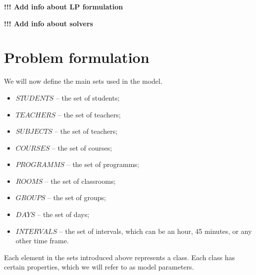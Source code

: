 \documentclass{article}
\begin{document}
\textbf{!!! Add info about LP formulation}

\textbf{!!! Add info about solvers}

\section{Problem formulation}

We will now define the main sets used in the model.

\begin{itemize}
  \setlength\itemsep{0.05em}
    \item $STUDENTS$ -- the set of students;
    \item $TEACHERS$ -- the set of teachers;
    \item $SUBJECTS$ -- the set of teachers;
    \item $COURSES$ -- the set of courses;
    \item $PROGRAMMS$ -- the set of programms;
    \item $ROOMS$ -- the set of classrooms;
    \item $GROUPS$ -- the set of groups;
    \item $DAYS$ -- the set of days;
    \item $INTERVALS$ -- the set of intervals, which can be an hour, 45 minutes, or any other time frame.
\end{itemize}

Each element in the sets introduced above represents a class. Each class has certain properties, which we will refer to as model parameters.
\end{document}

